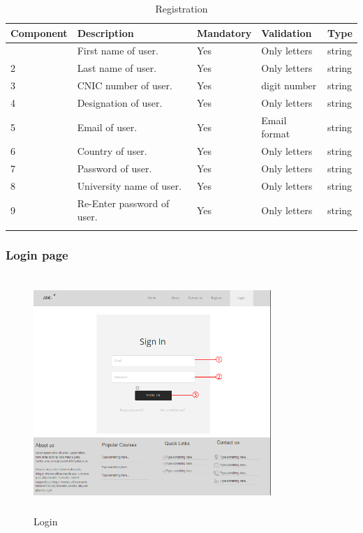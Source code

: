 \documentclass[12pt]{article}
\begin{document}
\begin{longtable}{|>{\raggedright\arraybackslash}p{2.5cm}|>{\raggedright\arraybackslash}p{2.5cm}|>{\raggedright\arraybackslash}p{2.5cm}|>{\raggedright\arraybackslash}p{2cm}|>{\raggedright\arraybackslash}p{2cm}|}
\hline
\textbf{Component} & \textbf{Description} & \textbf{Mandatory} & \textbf{Validation} & \textbf{Type}\\
\hline
1 &
First name of user. &
Yes &
Only letters &
string \\
\hline

2 &
Last name of user. &
Yes &
Only letters &
string \\
\hline

3 &
CNIC number of user. &
Yes &
16 digit number &
string \\
\hline

4 &
Designation of user. &
Yes &
Only letters &
string \\
\hline

5 &
Email of user. &
Yes &
Email format &
string \\
\hline

6 &
Country of user. &
Yes &
Only letters &
string \\
\hline


7 &
Password of user. &
Yes &
Only letters &
string \\
\hline

8 &
University name of user. &
Yes &
Only letters &
string \\
\hline

9 &
Re-Enter password of user. &
Yes &
Only letters &
string \\
\hline

\caption{Registration}
\end{longtable}

\subsubsection{Login page}
\begin{figure}[H]
  \centering
  \includegraphics[width=9cm, height=9cm]{Login}
  \caption{Login}
\end{figure}
\end{document}

